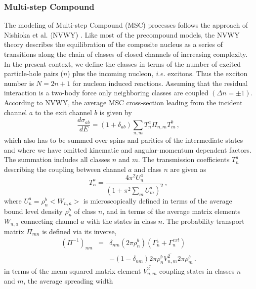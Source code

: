 \documentclass[twocolumn,amsmath,amssymb,10pt,groupedaddress,letter]{revtex4}
\begin{document}
\subsubsection{Multi-step Compound\label{sec: MSC}}
The modeling of Multi-step Compound (MSC)
processes follows the approach of Nishioka et al. (NVWY)
\cite{NVWY}. Like most of the precompound models, the NVWY theory
describes the equilibration of the composite nucleus as a series of
transitions along the chain of classes of closed channels of increasing
complexity. In the present context, we define the classes in terms
of the number of excited particle-hole pairs ($n$) plus the incoming
nucleon, {\it i.e.} excitons. Thus the exciton number is $N=2n+1$ for nucleon
induced reactions. Assuming that the residual interaction is a two-body
force only neighboring classes are coupled $(\Delta n=\pm1)$.
According to NVWY, the average MSC cross-section
leading from the incident channel $a$ to the exit channel $b$ is
given by
\begin{equation}
\frac{d\sigma_{ab}}{dE}=(1+\delta_{ab})\sum_{n,m}T_{n}^{a}\Pi_{n,m}T_{m}^{b}\,,
\label{msccs}
\end{equation}
which also has to be summed over spins and parities of the intermediate
states and where we have omitted kinematic and angular-momentum dependent
factors. The summation includes all classes $n$ and $m$. The transmission
coefficients $T_{n}^{a}$ describing the coupling between channel
$a$ and class $n$ are given as
\begin{equation}
T_{n}^{a}=\frac{4\pi^{2}U_{n}^{a}}{\left(1+\pi^{2}\sum_{m}U_{m}^{a}\right)^{2}}\,,
\label{TlMSC}
\end{equation}
\noindent where $U_{n}^{a}=\rho_{n}^{b}<W_{n,a}>$ is microscopically defined
in terms of the average bound level density
$\rho_{n}^{b}$ of class $n$, and in terms of the average matrix
elements $W_{n,a}$ connecting channel $a$ with the states in class
$n$. The probability transport matrix $\Pi_{mn}$ is defined via
its inverse,
\begin{eqnarray}
(\Pi^{-1})_{nm}&=&\delta_{nm}(2\pi\rho_{n}^{b})(\Gamma_{n}^{\downarrow}+\Gamma_{n}^{ext})\nonumber\\
&&-(1-\delta_{nm})2\pi\rho_{n}^{b}\overline{V_{n,m}^{2}}2\pi\rho_{m}^{b}\,.\label{Pi}
\end{eqnarray}
in terms of the mean squared matrix element $\overline{V_{n,m}^{2}}$
coupling states in classes $n$ and $m$, the average spreading width
\end{document}
